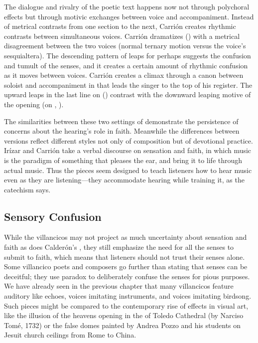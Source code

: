 
The dialogue and rivalry of the poetic text happens now not through polychoral effects but through motivic exchanges between voice and accompaniment.
Instead of metrical contrasts from one section to the next, Carrión creates rhythmic contrasts between simultaneous voices.
Carrión dramatizes  () with a metrical disagreement between the two voices (normal ternary motion versus the voice's sesquialtera).
The descending pattern of leaps for  perhaps suggests the confusion and tumult of the senses, and it creates a certain amount of rhythmic confusion as it moves between voices.
Carrión creates a climax through a canon between soloist and accompaniment in  that leads the singer to the top of his register.
The upward leaps in the last line on  () contrast with the downward leaping motive of the opening (on , ).

The similarities between these two settings of  demonstrate the persistence of concerns about the hearing's role in faith.
Meanwhile the differences between versions reflect different styles not only of composition but of devotional practice.
Irízar and Carrión take a verbal discourse on sensation and faith, in which music is the paradigm of something that pleases the ear, and bring it to life through actual music.
Thus the pieces seem designed to teach listeners how to hear music even as they are listening---they accommodate hearing while training it, as the catechism says.


\subsection{Sensory Confusion}

While the  villancicos may not project as much uncertainty about sensation and faith as does Calderón's , they still emphasize the need for all the senses to submit to faith, which means that listeners should not trust their senses alone.
Some villancico poets and composers go further than stating that senses can be deceitful; they use paradox to deliberately confuse the senses for pious purposes.
We have already seen in the previous chapter that many villancicos feature auditory  like echoes, voices imitating instruments, and voices imitating birdsong.
Such pieces might be compared to the contemporary rise of  effects in visual art, like the illusion of the heavens opening in the  of Toledo Cathedral (by Narciso Tomé, 1732) or the false domes painted by Andrea Pozzo and his students on Jesuit church ceilings from Rome to China.%
    \Autocites[]{GroveArt}[110]{Bailey:Art}

